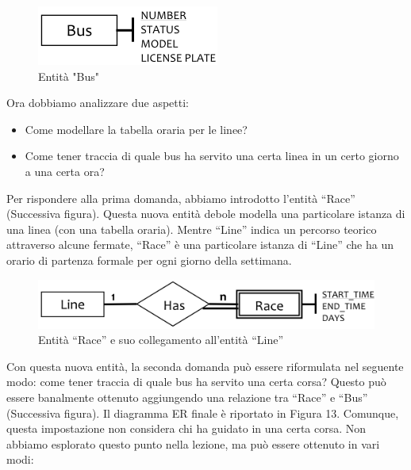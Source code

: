 \begin{center}
\begin{figure}[H]
\centering
\includegraphics[scale=1]{figures/bus.png}
\caption{Entità "Bus"} 
\end{figure}
\end{center}

Ora dobbiamo analizzare due aspetti:

\begin{itemize}

\item Come modellare la tabella oraria per le linee?
\item Come tener traccia di quale bus ha servito una certa linea in un certo giorno a una certa ora?  

\end{itemize}

Per rispondere alla prima domanda, abbiamo introdotto l’entità “Race” (Successiva figura). Questa nuova entità debole modella una particolare istanza di una linea (con una tabella oraria). Mentre “Line” indica un percorso teorico attraverso alcune fermate, “Race” è una particolare istanza di “Line” che ha un orario di partenza formale per ogni giorno della settimana. 

\begin{center}
\begin{figure}[H]
\centering
\includegraphics[scale=1]{figures/race_line.png}
\caption{Entità “Race” e suo collegamento all’entità “Line”} 
\end{figure}
\end{center}

Con questa nuova entità, la seconda domanda può essere riformulata nel seguente modo: come tener traccia di quale bus ha servito una certa corsa? Questo può essere banalmente ottenuto aggiungendo una relazione tra “Race” e “Bus” (Successiva figura). Il diagramma ER finale è riportato in Figura 13. Comunque, questa impostazione non considera chi ha guidato in una certa corsa. Non abbiamo esplorato questo punto nella lezione, ma può essere ottenuto in vari modi:


